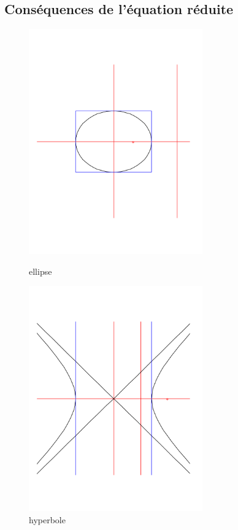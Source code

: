 \subsection{Conséquences de l'équation réduite}
\begin{figure}[ht]
  \hfill
  \begin{minipage}{.45\linewidth}
    \includegraphics[width=7.5cm]{C4893_3.pdf}
    \caption{ellipse}
    \label{fig:C4893_3}
  \end{minipage}
  \hfill
  \begin{minipage}{.45\linewidth}
    \includegraphics[width=7.5cm]{C4893_4.pdf}
    \caption{hyperbole}
    \label{fig:C4893_4}
  \end{minipage}
  \hfill
\end{figure}

